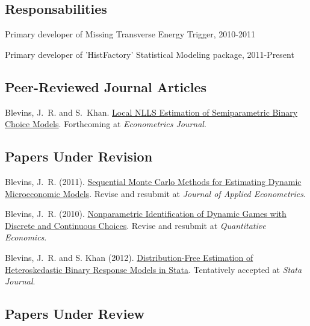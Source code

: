\documentclass[10pt,letterpaper]{article}
\renewenvironment{itemize}{
  \begin{list}{}{
    \setlength{\leftmargin}{1.5em}
    \setlength{\itemsep}{0.25em}
    \setlength{\parskip}{0pt}
    \setlength{\parsep}{0.25em}
  }
}{
  \end{list}
}
\begin{document}
\subsection*{Responsabilities}
\begin{itemize}
\item Primary developer of Missing Transverse Energy Trigger, 2010-2011
\item Primary developer of 'HistFactory' Statistical Modeling package, 2011-Present
\end{itemize}

\subsection*{Peer-Reviewed Journal Articles}

\begin{itemize}
\item Blevins, J.~R. and S.~Khan.
  \href{http://jblevins.org/research/lnlls}{Local NLLS Estimation of Semiparametric Binary Choice Models}.
  Forthcoming at \textit{Econometrics Journal}.
\end{itemize}

\subsection*{Papers Under Revision}

\begin{itemize}
\item Blevins, J.~R. (2011).
  \href{http://jblevins.org/research/smcdmm}{Sequential Monte Carlo Methods for Estimating Dynamic Microeconomic Models}.
  Revise and resubmit at \textit{Journal of Applied Econometrics}.
\item Blevins, J.~R. (2010).
  \href{http://jblevins.org/research/dcident}{Nonparametric Identification of Dynamic Games with Discrete and Continuous Choices}.
  Revise and resubmit at \textit{Quantitative Economics}.
\item Blevins, J.~R. and S. Khan (2012).
  \href{http://jblevins.org/research/dfbr/}{Distribution-Free Estimation of Heteroskedastic Binary Response Models in Stata}.
  Tentatively accepted at \textit{Stata Journal}.
\end{itemize}

\subsection*{Papers Under Review}
\end{document}
